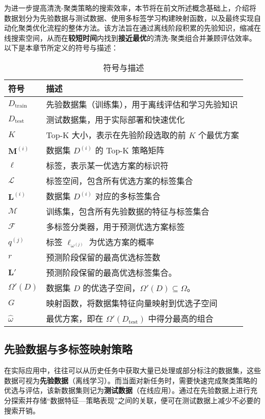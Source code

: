 \documentclass[8pt]{article} %
\numberwithin{equation}{section}
\begin{document}
为进一步提高清洗-聚类策略的搜索效率，本节将在前文所述概念基础上，介绍将数据划分为先验数据与测试数据、使用多标签学习构建映射函数，以及最终实现自动化聚类优化流程的整体方法。该方法旨在通过离线阶段积累的先验知识，缩减在线搜索空间，从而在\textbf{较短时间}内找到\textbf{接近最优}的清洗-聚类组合并兼顾评估效率。
以下是本章节所定义的符号与描述：

\begin{table}[ht]
\centering
\caption{符号与描述}
\label{tab:symbols-advanced}
\begin{tabular}{ll}
\toprule
\textbf{符号} & \textbf{描述} \\
\midrule
$D_{\text{train}}$ & 先验数据集（训练集），用于离线评估和学习先验知识 \\
$D_{\text{test}}$ & 测试数据集，用于实际部署和快速优化 \\
$K$ & Top-K 大小，表示在先验阶段选取的前 $K$ 个最优方案 \\
$\mathbf{M}^{(i)}$ & 数据集 $D^{(i)}$ 的 Top-K 策略矩阵 \\
$\ell$ & 标签，表示某一优选方案的标识符 \\
$\mathcal{L}$ & 标签空间，包含所有优选方案的标签集合 \\
$\mathbf{L}^{(i)}$ & 数据集 $D^{(i)}$ 对应的多标签集合 \\
$\mathcal{M}$ & 训练集，包含所有先验数据的特征与标签集合 \\
$\mathcal{F}$ & 多标签分类器，用于预测优选方案标签 \\
$q^{(j)}$ & 标签 $\ell_{\omega^{(j)}}$ 为优选方案的概率 \\
$r$ & 预测阶段保留的最高优选标签数 \\
$\mathbf{L}'$ & 预测阶段保留的最高优选标签集合。 \\
$\Omega'(D)$ & 数据集 $D$ 的优选子空间，$\Omega'(D) \subseteq \Omega$。 \\
$G$ & 映射函数，将数据集特征向量映射到优选子空间 \\
$\hat{\omega}$ & 最优方案，即在 $\Omega'(D_{\text{test}})$ 中得分最高的组合 \\
\bottomrule
\end{tabular}
\end{table}
\subsection{先验数据与多标签映射策略}
\label{sec:prior-data-mapping}

在实际应用中，往往可以从历史任务中获取大量已处理或部分标注的数据集，这些数据可视为\textbf{先验数据}（离线学习）。而当面对新任务时，需要快速完成聚类策略的优选与评估，该新数据集则记为\textbf{测试数据}（在线应用）。通过在先验数据上进行充分探索并存储“数据特征—策略表现”之间的关联，便可在测试数据上减少不必要的搜索开销。
\end{document}
